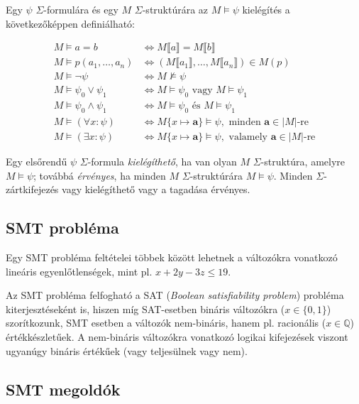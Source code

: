 Egy $\psi$ $\Sigma$-formulára és egy $M$ $\Sigma$-struktúrára az $M \models \psi$ kielégítés a következőképpen definiálható:

\begin{align*}
    M \models a = b &\iff M \llbracket a \rrbracket = M \llbracket b \rrbracket \\
    M \models p(a_1,\dots,a_n) &\iff (M \llbracket a_1 \rrbracket,\dots,M \llbracket a_n \rrbracket) \in M(p) \\
    M \models \neg \psi &\iff M \not \models \psi \\
    M \models \psi_0 \vee \psi_1 &\iff M \models \psi_0 \text{ vagy } M \models \psi_1 \\
    M \models \psi_0 \wedge \psi_1 &\iff M \models \psi_0 \text{ és } M \models \psi_1 \\
    M \models (\forall x: \psi) &\iff M\{x \mapsto \textbf{a}\} \models \psi, \text{ minden } \textbf{a} \in |M|\text{-re} \\
    M \models (\exists x: \psi) &\iff M\{x \mapsto \textbf{a}\} \models \psi, \text{ valamely } \textbf{a} \in |M|\text{-re}
\end{align*}

Egy elsőrendű $\psi$ $\Sigma$-formula \emph{kielégíthető}, ha van olyan $M$ $\Sigma$-struktúra, amelyre $M \models \psi$; továbbá \emph{érvényes}, ha minden $M$ $\Sigma$-struktúrára $M \models \psi$. Minden $\Sigma$-zártkifejezés vagy kielégíthető vagy a tagadása érvényes.

\subsection{SMT probléma}
Egy SMT probléma feltételei többek között lehetnek a változókra vonatkozó lineáris egyenlőtlenségek, mint pl. $x + 2y - 3z \leq 19$.

Az SMT probléma felfogható a SAT (\emph{Boolean satisfiability problem}) probléma kiterjesztéseként is, hiszen míg SAT-esetben bináris változókra ($x \in \{0, 1\}$) szorítkozunk, SMT esetben a változók nem-bináris, hanem pl. racionális ($x \in \mathbb{Q}$) értékkészletűek. A nem-bináris változókra vonatkozó logikai kifejezések viszont ugyanúgy bináris értékűek (vagy teljesülnek vagy nem).

\subsection{SMT megoldók} \label{smt-megoldok}

